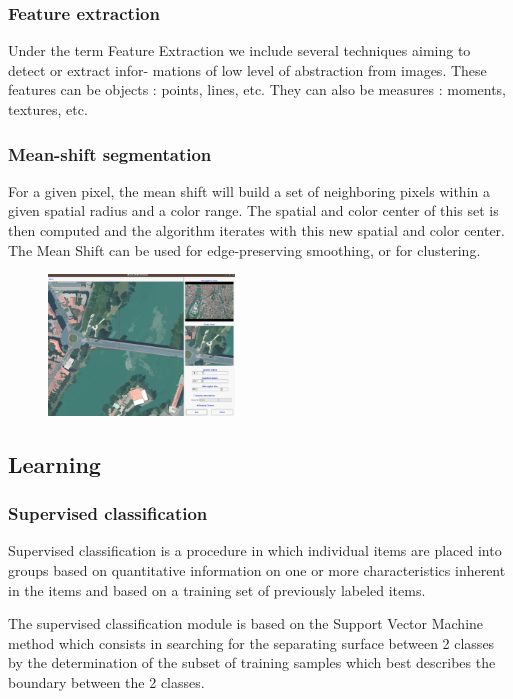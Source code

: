 \subsubsection{Feature extraction}

Under the term Feature Extraction we include several techniques aiming to detect or extract infor-
mations of low level of abstraction from images. These features can be objects : points, lines, etc.
They can also be measures : moments, textures, etc.

\subsubsection{Mean-shift segmentation}

For a given pixel, the mean shift will build a set of neighboring pixels within a given 
spatial radius and a color range. The spatial and color center of this set is then 
computed and the algorithm iterates with this new spatial and
color center. The Mean Shift can be used for edge-preserving smoothing, or for clustering.

\begin{figure}
   \center
   \includegraphics[width=0.44\textwidth]{../Art/MonteverdiImages/monteverdi_mean_shift.png}
   \label{fig:meanshift}
\end{figure}

\subsection{Learning}
\subsubsection{Supervised classification}
Supervised classification is a procedure in which individual items are placed into 
groups based on quantitative information on one or more characteristics inherent 
in the items and based on a training set of previously labeled items.

The supervised classification module is based on the Support Vector Machine method
which consists in searching for the separating surface between 2 classes by
the determination of the subset of training samples which best describes the boundary between the 2
classes.

